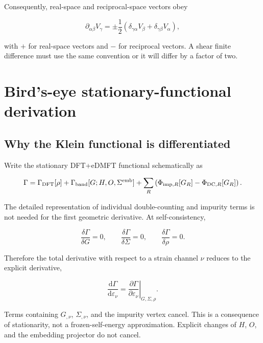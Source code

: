 \documentclass[11pt]{article}
\numberwithin{equation}{section}
\newcommand{\dd}{\mathrm d}
\begin{document}
Consequently, real-space and reciprocal-space vectors obey

\begin{equation}
 \partial_{\alpha\beta}V_\gamma
 =\pm\frac12(\delta_{\gamma\alpha}V_\beta
             +\delta_{\gamma\beta}V_\alpha),
\end{equation}

with $+$ for real-space vectors and $-$ for reciprocal vectors.  A shear
finite difference must use the same convention or it will differ by a factor
of two.

\section{Bird's-eye stationary-functional derivation}

\subsection{Why the Klein functional is differentiated}

Write the stationary DFT+eDMFT functional schematically as

\begin{equation}
 \Gamma=\Gamma_{\rm DFT}[\rho]
 +\Gamma_{\rm band}[G;H,O,\Sigma^{\rm emb}]
 +\sum_R\left(\Phi_{{\rm imp},R}[G_R]-\Phi_{{\rm DC},R}[G_R]\right).
 \label{eq:schematicKlein}
\end{equation}

The detailed representation of individual double-counting and impurity terms
is not needed for the first geometric derivative.  At self-consistency,

\begin{equation}
 \frac{\delta\Gamma}{\delta G}=0,
 \qquad \frac{\delta\Gamma}{\delta\Sigma}=0,
 \qquad \frac{\delta\Gamma}{\delta\rho}=0.
\end{equation}

Therefore the total derivative with respect to a strain channel $\nu$ reduces
to the explicit derivative,

\begin{equation}
 \frac{\dd\Gamma}{\dd\varepsilon_\nu}
 =\left.\frac{\partial\Gamma}{\partial\varepsilon_\nu}
 \right|_{G,\Sigma,\rho}.
 \label{eq:stationarity}
\end{equation}

Terms containing $G_{,\nu}$, $\Sigma_{,\nu}$, and the impurity vertex cancel.
This is a consequence of stationarity, not a frozen-self-energy
approximation.  Explicit changes of $H$, $O$, and the embedding projector do
not cancel.
\end{document}
